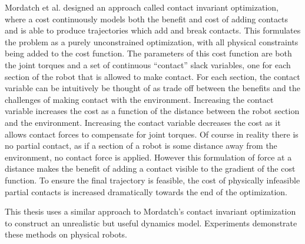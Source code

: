 \documentclass[../thesis.tex]{subfiles}
\begin{document}
Mordatch et al. \cite{Mordatch2012} designed an approach called contact invariant optimization, where a cost continuously models both the benefit and cost of adding contacts and is able to produce trajectories which add and break contacts.
This formulates the problem as a purely unconstrained optimization, with all physical constraints being added to the cost function.
The parameters of this cost function are both the joint torques and a set of continuous ``contact'' slack variables, one for each section of the robot that is allowed to make contact.
For each section, the contact variable can be intuitively be thought of as trade off between the benefits and the challenges of making contact with the environment.
Increasing the contact variable increases the cost as a function of the distance between the robot section and the environment.
Increasing the contact variable decreases the cost as it allows contact forces to compensate for joint torques.
Of course in reality there is no partial contact, as if a section of a robot is some distance away from the environment, no contact force is applied.
However this formulation of force at a distance makes the benefit of adding a contact visible to the gradient of the cost function.
To ensure the final trajectory is feasible, the cost of physically infeasible partial contacts is increased dramatically towards the end of the optimization. 

This thesis uses a similar approach to Mordatch's contact invariant optimization to construct an unrealistic but useful dynamics model.
Experiments demonstrate these methods on physical robots.
\end{document}
